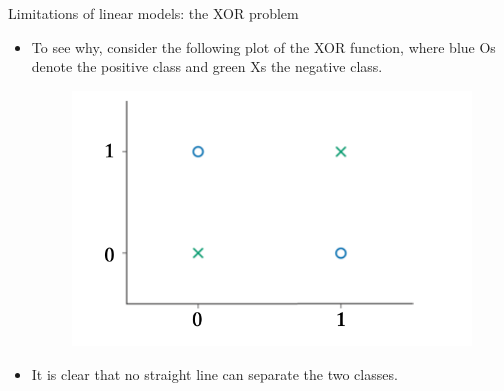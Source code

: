 \documentclass[handout]{beamer}
\begin{document}
\begin{frame}{Limitations of linear models: the XOR problem}
\begin{scriptsize}
\begin{itemize}
\item To see why, consider the following plot of the XOR function, where blue Os denote the positive class and green Xs the negative class.
\begin{figure}[htb]
	\centering
	 \includegraphics[scale=0.35]{pics/xor.png}
\end{figure}
\item It is clear that no straight line can separate the two classes.
\end{itemize}
\end{scriptsize}
\end{frame}
\end{document}
